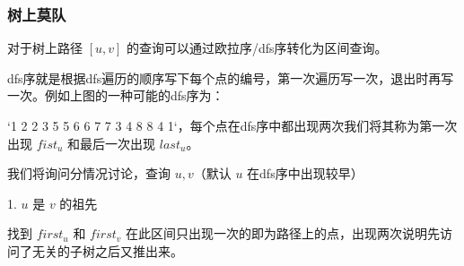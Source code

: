 \documentclass[12pt, a4paper, oneside]{ctexart}
\begin{document}
\newpage 
\subsubsection{树上莫队} 
对于树上路径 $[u, v]$ 的查询可以通过欧拉序/dfs序转化为区间查询。\par
dfs序就是根据dfs遍历的顺序写下每个点的编号，第一次遍历写一次，退出时再写一次。例如上图的一种可能的dfs序为：\par
`1 2 2 3 5 5 6 6 7 7 3 4 8 8 4 1`，每个点在dfs序中都出现两次我们将其称为第一次出现 $fist_u$ 和最后一次出现 $last_u$。\par

我们将询问分情况讨论，查询 $u, v$（默认 $u$ 在dfs序中出现较早）\par

1. $u$ 是 $v$ 的祖先\par
   找到 $first_u$ 和 $first_v$ 在此区间只出现一次的即为路径上的点，出现两次说明先访问了无关的子树之后又推出来。\par
\end{document}
